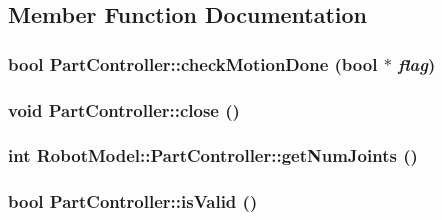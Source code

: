 \subsection{Member Function Documentation}
\hypertarget{class_robot_model_1_1_part_controller_a4052252cc91ea1387d5a33c968e9a84a}{
\subsubsection[{checkMotionDone}]{\setlength{\rightskip}{0pt plus 5cm}bool PartController::checkMotionDone (bool $\ast$ {\em flag})}}
\label{class_robot_model_1_1_part_controller_a4052252cc91ea1387d5a33c968e9a84a}
\hypertarget{class_robot_model_1_1_part_controller_a7e0fbd5bd25cebb78cd1b095c2055dac}{
\subsubsection[{close}]{\setlength{\rightskip}{0pt plus 5cm}void PartController::close ()}}
\label{class_robot_model_1_1_part_controller_a7e0fbd5bd25cebb78cd1b095c2055dac}
\hypertarget{class_robot_model_1_1_part_controller_a2fb04bfb6b1da63201fdaf3dac6591dc}{
\subsubsection[{getNumJoints}]{\setlength{\rightskip}{0pt plus 5cm}int RobotModel::PartController::getNumJoints ()}}
\label{class_robot_model_1_1_part_controller_a2fb04bfb6b1da63201fdaf3dac6591dc}
\hypertarget{class_robot_model_1_1_part_controller_a02d325bdc7bd18023e47f97894a2de49}{
\subsubsection[{isValid}]{\setlength{\rightskip}{0pt plus 5cm}bool PartController::isValid ()}}
